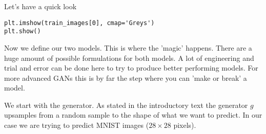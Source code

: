 \documentclass[%
oneside,                 %
final,                   %
10pt]{article}
\begin{document}
Let's have a quick look




\begin{verbatim}
plt.imshow(train_images[0], cmap='Greys')
plt.show()

\end{verbatim}


Now we define our two models. This is where the 'magic' happens. There are a
huge amount of possible formulations for both models. A lot of engineering and
trial and error can be done here to try to produce better performing models. For
more advanced GANs this is by far the step where you can 'make or break' a
model.

We start with the generator. As stated in the introductory text the generator
$g$ upsamples from a random sample to the shape of what we want to predict. In
our case we are trying to predict MNIST images ($28\times 28$ pixels).
\end{document}
